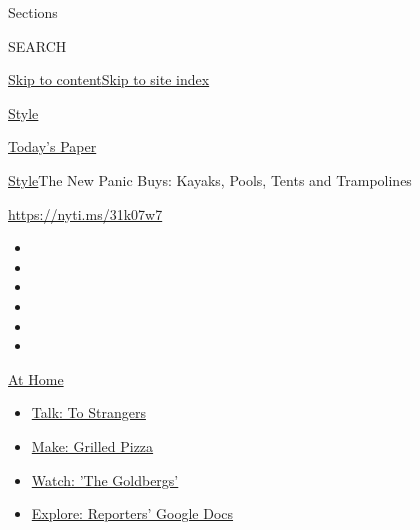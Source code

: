 Sections

SEARCH

\protect\hyperlink{site-content}{Skip to
content}\protect\hyperlink{site-index}{Skip to site index}

\href{https://www.nytimes3xbfgragh.onion/section/style}{Style}

\href{https://myaccount.nytimes3xbfgragh.onion/auth/login?response_type=cookie\&client_id=vi}{}

\href{https://www.nytimes3xbfgragh.onion/section/todayspaper}{Today's
Paper}

\href{/section/style}{Style}\textbar{}The New Panic Buys: Kayaks, Pools,
Tents and Trampolines

\url{https://nyti.ms/31k07w7}

\begin{itemize}
\item
\item
\item
\item
\item
\item
\end{itemize}

\href{https://www.nytimes3xbfgragh.onion/spotlight/at-home?action=click\&pgtype=Article\&state=default\&region=TOP_BANNER\&context=at_home_menu}{At
Home}

\begin{itemize}
\tightlist
\item
  \href{https://www.nytimes3xbfgragh.onion/2020/08/03/well/family/the-benefits-of-talking-to-strangers.html?action=click\&pgtype=Article\&state=default\&region=TOP_BANNER\&context=at_home_menu}{Talk:
  To Strangers}
\item
  \href{https://www.nytimes3xbfgragh.onion/2020/08/01/at-home/coronavirus-make-pizza-on-a-grill.html?action=click\&pgtype=Article\&state=default\&region=TOP_BANNER\&context=at_home_menu}{Make:
  Grilled Pizza}
\item
  \href{https://www.nytimes3xbfgragh.onion/2020/07/31/arts/television/goldbergs-abc-stream.html?action=click\&pgtype=Article\&state=default\&region=TOP_BANNER\&context=at_home_menu}{Watch:
  'The Goldbergs'}
\item
  \href{https://www.nytimes3xbfgragh.onion/interactive/2020/at-home/even-more-reporters-editors-diaries-lists-recommendations.html?action=click\&pgtype=Article\&state=default\&region=TOP_BANNER\&context=at_home_menu}{Explore:
  Reporters' Google Docs}
\end{itemize}

